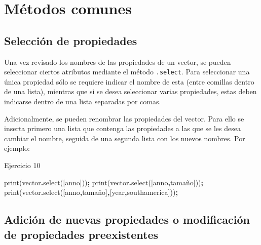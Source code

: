 \documentclass[
  12pt,
  letterpaper,
  twoside]{book}
\newenvironment{Shaded}{\begin{snugshade}}{\end{snugshade}}
\newcommand{\FunctionTok}[1]{\textcolor[rgb]{0.00,0.00,0.00}{#1}}
\newcommand{\NormalTok}[1]{#1}
\newcommand{\OperatorTok}[1]{\textcolor[rgb]{0.81,0.36,0.00}{\textbf{#1}}}
\newcommand{\StringTok}[1]{\textcolor[rgb]{0.31,0.60,0.02}{#1}}
\begin{document}
\hypertarget{muxe9todos-comunes-1}{%
\section{Métodos comunes}\label{muxe9todos-comunes-1}}

\hypertarget{selecciuxf3n-de-propiedades}{%
\subsection*{Selección de propiedades}\label{selecciuxf3n-de-propiedades}}

Una vez revisado los nombres de las propiedades de un vector, se pueden seleccionar ciertos atributos mediante el método \texttt{.select}. Para seleccionar una única propiedad sólo se requiere indicar el nombre de esta (entre comillas dentro de una lista), mientras que si se desea seleccionar varias propiedades, estas deben indicarse dentro de una lista separadas por comas.

Adicionalmente, se pueden renombrar las propiedades del vector. Para ello se inserta primero una lista que contenga las propiedades a las que se les desea cambiar el nombre, seguida de una segunda lista con los nuevos nombres. Por ejemplo:

Ejercicio 10

\begin{Shaded}
\begin{Highlighting}[]
\FunctionTok{print}\NormalTok{(vector}\OperatorTok{.}\FunctionTok{select}\NormalTok{([}\StringTok{\textquotesingle{}anno\textquotesingle{}}\NormalTok{]))}\OperatorTok{;}
\FunctionTok{print}\NormalTok{(vector}\OperatorTok{.}\FunctionTok{select}\NormalTok{([}\StringTok{\textquotesingle{}anno\textquotesingle{}}\OperatorTok{,}\StringTok{\textquotesingle{}tamaño\textquotesingle{}}\NormalTok{]))}\OperatorTok{;}
\FunctionTok{print}\NormalTok{(vector}\OperatorTok{.}\FunctionTok{select}\NormalTok{([}\StringTok{\textquotesingle{}anno\textquotesingle{}}\OperatorTok{,}\StringTok{\textquotesingle{}tamaño\textquotesingle{}}\NormalTok{]}\OperatorTok{,}\NormalTok{[}\StringTok{\textquotesingle{}year\textquotesingle{}}\OperatorTok{,}\StringTok{\textquotesingle{}southamerica\textquotesingle{}}\NormalTok{]))}\OperatorTok{;}
\end{Highlighting}
\end{Shaded}

\hypertarget{adiciuxf3n-de-nuevas-propiedades-o-modificaciuxf3n-de-propiedades-preexistentes}{%
\subsection*{Adición de nuevas propiedades o modificación de propiedades preexistentes}\label{adiciuxf3n-de-nuevas-propiedades-o-modificaciuxf3n-de-propiedades-preexistentes}}
\end{document}
